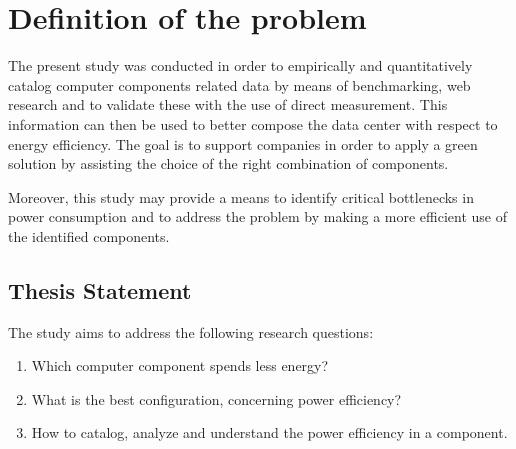 


\section{Definition of the problem} \label{sec1:problem}
    The present study was conducted in order to empirically and quantitatively catalog computer components related data by means of benchmarking, web research and to validate these with the use of direct measurement. This information can then be used to better compose the data center with respect to energy efficiency. The goal is to support companies in order to apply a green solution by assisting the choice of the right combination of components.
    
    Moreover, this study may provide a means to identify critical bottlenecks in power consumption and to address the problem by making a more efficient use of the identified components. 
    
    \subsection{Thesis Statement}\label{sec1:thesis_statement}
        The study aims to address the following research questions:
        \begin{enumerate}
	        \item Which computer component spends less energy?
	        \item What is the best configuration, concerning power efficiency?
	        \item How to catalog, analyze and understand the power efficiency in a component.
        \end{enumerate}

